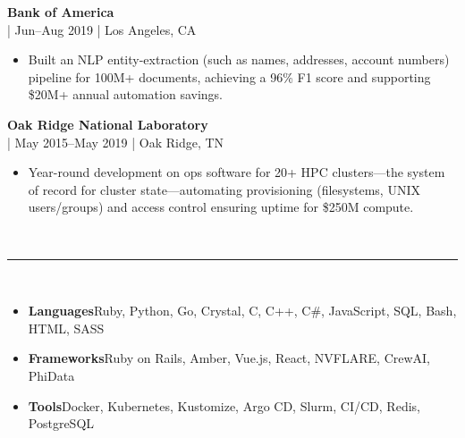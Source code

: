 \documentclass[11pt,a4paper]{article}
\newcommand{\resumesection}[1]{
    \vspace{3pt}                                    %
    \noindent{\fontsize{13.65}{16}\selectfont\textbf{#1}}\\[-8pt]                    %
    \noindent\textcolor{gray}{\rule{\textwidth}{2pt}}\\[-5pt]  %
    \vspace{-8pt}                                   %
}
\newcommand{\regbullet}[1]{
    \item {\fontsize{10}{12}\selectfont #1}
}
\begin{document}
\vspace{8pt}
\noindent\textbf{Bank of America}\\
  |  {\fontsize{10}{12}\selectfont Jun--Aug 2019}  |  {\fontsize{10}{12}\selectfont Los Angeles, CA}
\begin{itemize}[leftmargin=18pt,itemsep=1pt,topsep=0pt]
\regbullet{Built an NLP entity-extraction (such as names, addresses, account numbers) pipeline for 100M+ documents, achieving a 96\% F1 score and supporting \$20M+ annual automation savings.}
\end{itemize}

\vspace{8pt}
\noindent\textbf{Oak Ridge National Laboratory}\\
  |  {\fontsize{10}{12}\selectfont May 2015--May 2019}  |  {\fontsize{10}{12}\selectfont Oak Ridge, TN}
\begin{itemize}[leftmargin=18pt,itemsep=1pt,topsep=0pt]
\regbullet{Year-round development on ops software for 20+ HPC clusters—the system of record for cluster state—automating provisioning (filesystems, UNIX users/groups) and access control ensuring uptime for \$250M compute.}
\end{itemize}
\vspace{8pt}




\resumesection{Skills}

\begin{itemize}[leftmargin=18pt,itemsep=1pt,topsep=0pt]
    \regbullet{\textbf{Languages}\hspace{23pt}Ruby, Python, Go, Crystal, C, C++, C\#, JavaScript, SQL, Bash, HTML, SASS}

    \regbullet{\textbf{Frameworks}\hspace{13pt}Ruby on Rails, Amber, Vue.js, React, NVFLARE, CrewAI, PhiData}

    \regbullet{\textbf{Tools}\hspace{50pt}Docker, Kubernetes, Kustomize, Argo CD, Slurm, CI/CD, Redis, PostgreSQL}
\end{itemize}
\vspace{4pt}
\end{document}
